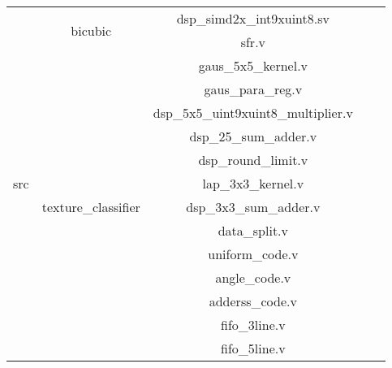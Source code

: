 \begin{table}[h]
    \centering
    \begin{tabular}{|c|c|c|ll}
    \cline{1-3}
    \multirow{24}{*}{src} & \multirow{2}{*}{bicubic}              & dsp\_simd2x\_int9xuint8.sv          &  &  \\ \cline{3-3}
                          &                                       & sfr.v                               &  &  \\ \cline{2-3}
                          & \multirow{16}{*}{texture\_classifier} & gaus\_5x5\_kernel.v                 &  &  \\ \cline{3-3}
                          &                                       & gaus\_para\_reg.v                   &  &  \\ \cline{3-3}
                          &                                       & dsp\_5x5\_uint9xuint8\_multiplier.v &  &  \\ \cline{3-3}
                          &                                       & dsp\_25\_sum\_adder.v               &  &  \\ \cline{3-3}
                          &                                       & dsp\_round\_limit.v                 &  &  \\ \cline{3-3}
                          &                                       & lap\_3x3\_kernel.v                  &  &  \\ \cline{3-3}
                          &                                       & dsp\_3x3\_sum\_adder.v              &  &  \\ \cline{3-3}
                          &                                       & data\_split.v                       &  &  \\ \cline{3-3}
                          &                                       & uniform\_code.v                     &  &  \\ \cline{3-3}
                          &                                       & angle\_code.v                       &  &  \\ \cline{3-3}
                          &                                       & adderss\_code.v                     &  &  \\ \cline{3-3}
                          &                                       & fifo\_3line.v                       &  &  \\ \cline{3-3}
                          &                                       & fifo\_5line.v                       &  &  \\ \cline{3-3}

\end{tabular}
\end{table}
